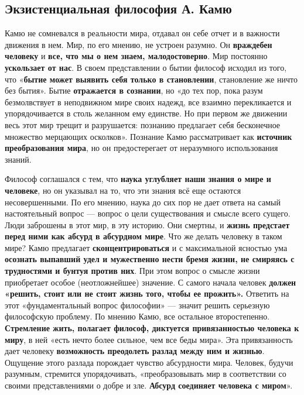 \documentclass{article}
\begin{document}
\subsection{Экзистенциальная философия А. Камю}

\begin{flushleft}

Камю не сомневался в реальности мира, отдавал он себе отчет и в важности движения в нем. Мир, по его мнению, не устроен разумно. Он \textbf{враждебен человеку} и \textbf{все, что мы о нем знаем, малодостоверно}. Мир постоянно \textbf{ускользает от нас}. В своем представлении о бытии философ исходил из того, что «\textbf{бытие может выявить себя только в становлении}, становление же ничто без бытия». Бытие \textbf{отражается в сознании}, но «до тех пор, пока разум безмолвствует в неподвижном мире своих надежд, все взаимно перекликается и упорядочивается в столь желанном ему единстве. Но при первом же движении весь этот мир трещит и разрушается: познанию предлагает себя бесконечное множество мерцающих осколков». Познание Камю рассматривает как \textbf{источник преобразования мира}, но он предостерегает от неразумного использования знаний.

\hfill

Философ соглашался с тем, что \textbf{наука углубляет наши знания о мире и человеке}, но он указывал на то, что эти знания всё еще остаются несовершенными. По его мнению, наука до сих пор не дает ответа на самый настоятельный вопрос — вопрос о цели существования и смысле всего сущего. Люди заброшены в этот мир, в эту историю. Они смертны, и \textbf{жизнь предстает перед ними как абсурд в абсурдном мире}. Что же делать человеку в таком мире? Камю предлагает \textbf{сконцентрироваться} и с максимальной ясностью ума \textbf{осознать выпавший удел и мужественно нести бремя жизни, не смиряясь с трудностями и бунтуя против них}. При этом вопрос о смысле жизни приобретает особое (неотложнейшее) значение. С самого начала человек \textbf{должен «решить, стоит или не стоит жизнь того, чтобы ее прожить».} Ответить на этот «фундаментальный вопрос философии» — значит решить серьезную философскую проблему. По мнению Камю, все остальное второстепенно. \textbf{Стремление жить, полагает философ, диктуется привязанностью человека к миру}, в ней «есть нечто более сильное, чем все беды мира». Эта привязанность дает человеку \textbf{возможность преодолеть разлад между ним и жизнью}. Ощущение этого разлада порождает чувство абсурдности мира. Человек, будучи разумным, стремится упорядочивать, «преобразовывать мир в соответствии со своими представлениями о добре и зле. \textbf{Абсурд соединяет человека с миром}».


\end{flushleft}
\end{document}
